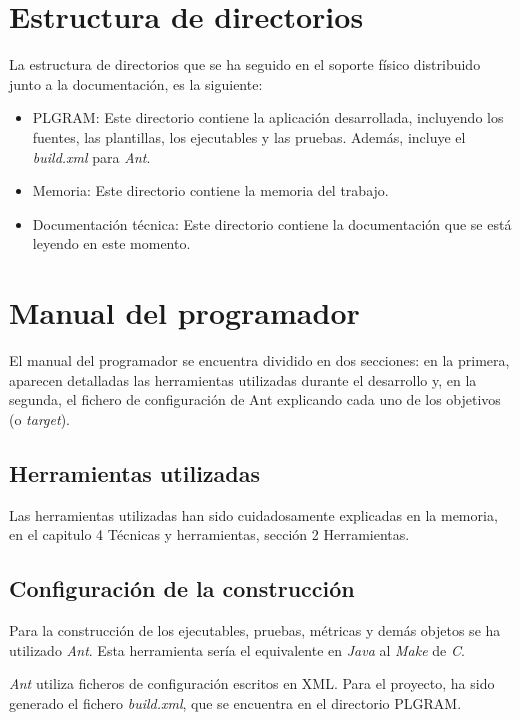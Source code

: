 \section{Estructura de directorios}

La estructura de directorios que se ha seguido en el soporte físico distribuido junto a la documentación, es la siguiente:
\begin{itemize}
\item PLGRAM: Este directorio contiene la aplicación desarrollada, incluyendo los fuentes, las plantillas, los ejecutables y las pruebas. Además, incluye el \textit{build.xml} para \textit{Ant}.
\item Memoria: Este directorio contiene la memoria del trabajo.
\item Documentación técnica: Este directorio contiene la documentación que se está leyendo en este momento.
\end{itemize}

\section{Manual del programador}

El manual del programador se encuentra dividido en dos secciones: en la primera, aparecen detalladas las herramientas utilizadas durante el desarrollo y, en la segunda, el fichero de configuración
de Ant explicando cada uno de los objetivos (o \textit{target}).

\subsection{Herramientas utilizadas}

Las herramientas utilizadas han sido cuidadosamente explicadas en la memoria, en el capitulo 4 Técnicas y herramientas, sección 2 Herramientas.


\subsection{Configuración de la construcción}



Para la construcción de los ejecutables, pruebas, métricas y demás objetos se ha utilizado \textit{Ant}. Esta herramienta sería el equivalente en \textit{Java} al \textit{Make} de \textit{C}.

\textit{Ant} utiliza ficheros de configuración escritos en XML. Para el proyecto, ha sido generado el fichero \textit{build.xml}, que se encuentra en el directorio PLGRAM.

